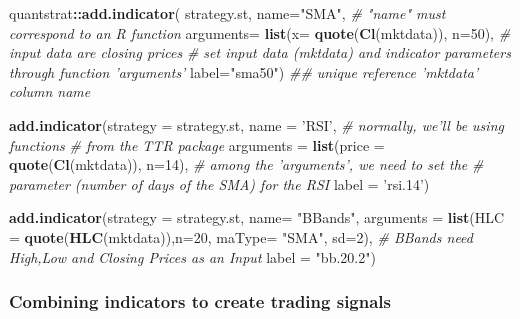 \documentclass[
  11pt,
]{article}
\newenvironment{Shaded}{\begin{snugshade}}{\end{snugshade}}
\newcommand{\CommentTok}[1]{\textcolor[rgb]{0.56,0.35,0.01}{\textit{#1}}}
\newcommand{\DataTypeTok}[1]{\textcolor[rgb]{0.13,0.29,0.53}{#1}}
\newcommand{\DecValTok}[1]{\textcolor[rgb]{0.00,0.00,0.81}{#1}}
\newcommand{\KeywordTok}[1]{\textcolor[rgb]{0.13,0.29,0.53}{\textbf{#1}}}
\newcommand{\NormalTok}[1]{#1}
\newcommand{\OperatorTok}[1]{\textcolor[rgb]{0.81,0.36,0.00}{\textbf{#1}}}
\newcommand{\StringTok}[1]{\textcolor[rgb]{0.31,0.60,0.02}{#1}}
\begin{document}
\begin{Shaded}
\begin{Highlighting}[]
\NormalTok{quantstrat}\OperatorTok{::}\KeywordTok{add.indicator}\NormalTok{(}
\NormalTok{  strategy.st, }\DataTypeTok{name=}\StringTok{"SMA"}\NormalTok{, }\CommentTok{# "name" must correspond to an R function}
  \DataTypeTok{arguments=} \KeywordTok{list}\NormalTok{(}\DataTypeTok{x=} \KeywordTok{quote}\NormalTok{(}\KeywordTok{Cl}\NormalTok{(mktdata)), }\DataTypeTok{n=}\DecValTok{50}\NormalTok{), }\CommentTok{# input data are closing prices}
  \CommentTok{# set input data (mktdata) and indicator parameters through function 'arguments'}
  \DataTypeTok{label=}\StringTok{"sma50"}\NormalTok{) }\CommentTok{## unique reference 'mktdata' column name}

\KeywordTok{add.indicator}\NormalTok{(}\DataTypeTok{strategy =}\NormalTok{ strategy.st,}
              \DataTypeTok{name =} \StringTok{'RSI'}\NormalTok{, }\CommentTok{# normally, we'll be using functions }
              \CommentTok{# from the TTR package }
              \DataTypeTok{arguments =} \KeywordTok{list}\NormalTok{(}\DataTypeTok{price =} \KeywordTok{quote}\NormalTok{(}\KeywordTok{Cl}\NormalTok{(mktdata)), }\DataTypeTok{n=}\DecValTok{14}\NormalTok{), }
              \CommentTok{# among the 'arguments', we need to set the }
              \CommentTok{# parameter (number of days of the SMA) for the RSI}
              \DataTypeTok{label =} \StringTok{'rsi.14'}\NormalTok{)}

\KeywordTok{add.indicator}\NormalTok{(}\DataTypeTok{strategy =}\NormalTok{ strategy.st,}
              \DataTypeTok{name=} \StringTok{"BBands"}\NormalTok{, }
              \DataTypeTok{arguments =} 
                \KeywordTok{list}\NormalTok{(}\DataTypeTok{HLC =} \KeywordTok{quote}\NormalTok{(}\KeywordTok{HLC}\NormalTok{(mktdata)),}\DataTypeTok{n=}\DecValTok{20}\NormalTok{, }\DataTypeTok{maType=} \StringTok{"SMA"}\NormalTok{, }\DataTypeTok{sd=}\DecValTok{2}\NormalTok{), }
              \CommentTok{# BBands need High,Low and Closing Prices as an Input}
              \DataTypeTok{label =} \StringTok{"bb.20.2"}\NormalTok{)}
\end{Highlighting}
\end{Shaded}

\hypertarget{combining-indicators-to-create-trading-signals}{%
\subsubsection{Combining indicators to create trading
signals}\label{combining-indicators-to-create-trading-signals}}
\end{document}

